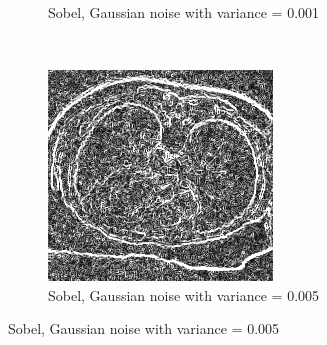 \begin{figure}[H]
\begin{subfigure}{.5\textwidth}
    \caption{Sobel, Gaussian noise with variance = 0.001}
    \label{fig:sobel_001}
  \end{subfigure}\\%
  \begin{subfigure}{.5\textwidth}
    \centering
    \includegraphics[width=.9\textwidth]{./edgedetection/images/sobel_005_noise}
    \caption{Sobel, Gaussian noise with variance = 0.005}
    \label{fig:sobel_005}
  \end{subfigure}%
  
\end{figure}
